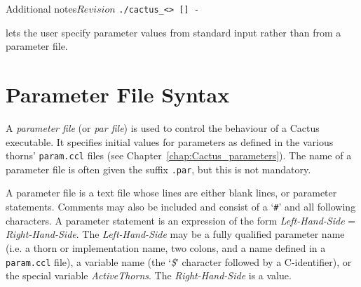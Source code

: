 \begin{cactuspart}{Additional notes}{}{$Revision$}
\texttt{./cactus\_<> [] -}

lets the user specify parameter values from standard input rather than
from a parameter file.


\section{Parameter File Syntax}
\label{sec:Parameter_File}

A \textit{parameter file} (or \textit{par file}) is used to control the
behaviour of a Cactus executable.  It specifies initial values for parameters
as defined in the various thorns' \texttt{param.ccl} files
(see Chapter~\ref{chap:Cactus_parameters}).
The name of a parameter file is often given the suffix \texttt{.par}, but
this is not mandatory.

A parameter file is a text file whose lines are either blank lines, or parameter
statements. Comments may also be included and consist of a `\texttt{\#}' and
all following characters. A parameter statement is an expression of the form
\textit{Left-Hand-Side} = \textit{Right-Hand-Side}.
The \textit{Left-Hand-Side} may be a fully qualified parameter name
(i.e. a thorn or implementation name, two colons, and a name defined in a \verb=param.ccl= file),
a variable name (the `\textit{\$}' character followed by a C-identifier), or
the special variable \textit{ActiveThorns}.
The \textit{Right-Hand-Side} is a value.


\end{cactuspart}

